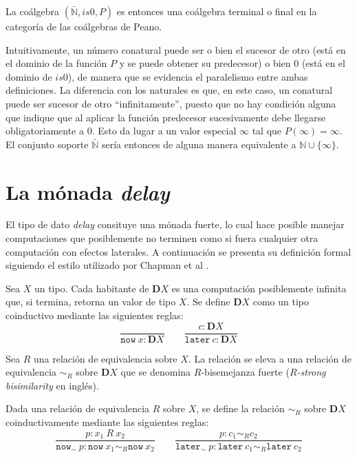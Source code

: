 La coálgebra $(\bar{\mathbb{N}},is0,P)$ es entonces una coálgebra terminal o final en la categoría de las coálgebras de Peano.  

Intuitivamente, un número conatural puede ser o bien el sucesor de otro (está en el dominio de la función $P$ y se puede obtener su predecesor) o bien $0$ (está en el dominio de $is0$), de manera que se evidencia el paralelismo entre ambas definiciones. La diferencia con los naturales es que, en este caso, un conatural puede ser sucesor de otro ``infinitamente'', puesto que no hay condición alguna que indique que al aplicar la función predecesor sucesivamente debe llegarse obligatoriamente a $0$. Esto da lugar a un valor especial $\infty$ tal que $P(\infty) = \infty$. El conjunto soporte $\bar{\mathbb{N}}$ sería entonces de alguna manera equivalente a $\mathbb{N} \cup \{\infty\}$. 


\section{La mónada \textit{delay}}\label{delay:delay}

El tipo de dato \textit{delay} consituye una mónada fuerte, lo cual hace posible manejar computaciones que posiblemente no terminen como si fuera cualquier otra computación con efectos laterales. A continuación se presenta su definición formal siguiendo el estilo utilizado por Chapman et al \cite{chapman:2019}. 

\begin{definition}
Sea $X$ un tipo. Cada habitante de $\mathbf{D} X$ es una computación posiblemente infinita que, si termina, retorna un valor de tipo $X$. Se define $\mathbf{D} X$ como un tipo coinductivo mediante las siguientes reglas:
\begin{equation*}
\dfrac{}{\mathtt{now} \ x : \mathbf{D} X} 	\qquad  	\dfrac{c : \mathbf{D} X}{\mathtt{later} \ c : \mathbf{D} X}
\end{equation*}
\end{definition}

Sea $R$ una relación de equivalencia sobre $X$. La relación se eleva a una relación de equivalencia $\sim_R$ sobre $\mathbf{D}X$ que se denomina $R$-bisemejanza fuerte (\textit{$R$-strong bisimilarity} en inglés). 

\begin{definition}
Dada una relación de equivalencia $R$ sobre $X$, se define la relación $\sim_R$ sobre $\mathbf{D}X$ coinductivamente mediante las siguientes reglas:
\begin{equation*}
\dfrac{p : x_1 \ R \ x_2}{\mathtt{now}_{\sim} \ p : \mathtt{now} \ x_1 \sim_R \mathtt{now} \ x_2}  	\qquad  	\dfrac{p : c_1 \sim_R c_2}{\mathtt{later}_{\sim} \ p : \mathtt{later} \ c_1 \sim_R \mathtt{later} \ c_2}
\end{equation*}
\end{definition}

